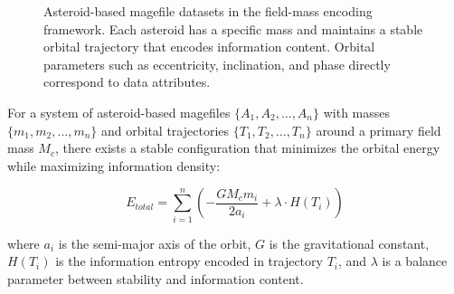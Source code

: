 \begin{figure}[h]
\centering
{}
\caption{Asteroid-based magefile datasets in the field-mass encoding framework. Each asteroid has a specific mass and maintains a stable orbital trajectory that encodes information content. Orbital parameters such as eccentricity, inclination, and phase directly correspond to data attributes.}
\label{fig:asteroid_magefile}
\end{figure}

\begin{theorem}
For a system of asteroid-based magefiles $\{A_1, A_2, \ldots, A_n\}$ with masses $\{m_1, m_2, \ldots, m_n\}$ and orbital trajectories $\{T_1, T_2, \ldots, T_n\}$ around a primary field mass $M_c$, there exists a stable configuration that minimizes the orbital energy while maximizing information density:

\begin{equation}
E_{total} = \sum_{i=1}^{n} \left( -\frac{G M_c m_i}{2 a_i} + \lambda \cdot H(T_i) \right)
\end{equation}

where $a_i$ is the semi-major axis of the orbit, $G$ is the gravitational constant, $H(T_i)$ is the information entropy encoded in trajectory $T_i$, and $\lambda$ is a balance parameter between stability and information content.
\end{theorem}

